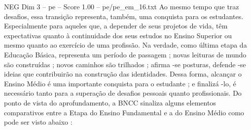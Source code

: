 \begin{textsample}{NEG Dim 3 – pe – Score 1.00 – pe/pe\_em\_16.txt}
Ao mesmo tempo que traz desafios, essa transição representa, também, uma conquista para os estudantes.
Especialmente para aqueles que, a depender de seus projetos de vida, têm expectativas quanto à continuidade dos seus estudos no Ensino Superior ou mesmo quanto ao exercício de uma profissão.
Na verdade, como última etapa da Educação Básica, representa um período de passagem ; novas leituras de mundo são construídas ; novos caminhos são trilhados ; afirma -se posturas, defende -se ideias que contribuirão na construção das identidades.
Dessa forma, alcançar o Ensino Médio é uma importante conquista para o estudante ; e finalizá -lo, é necessário tanto para a superação de desafios pessoais quanto profissionais.
Do ponto de vista do aprofundamento, a BNCC sinaliza alguns elementos comparativos entre a Etapa do Ensino Fundamental e a do Ensino Médio como pode ser visto abaixo :

\end{textsample}
